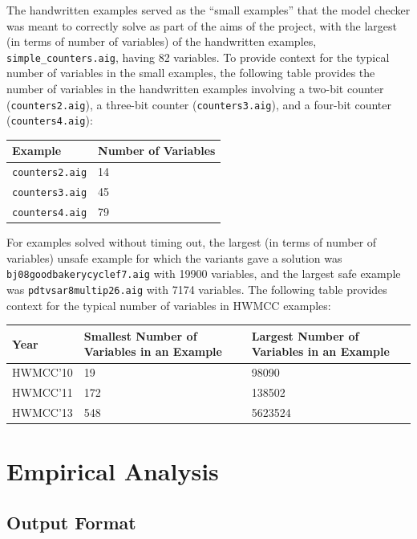 \documentclass[12pt,a4paper,twoside,openright]{report}
\begin{document}
{{The handwritten examples served as the ``small examples'' that the model checker
was meant to correctly solve as part of the aims of the project, with the largest
(in terms of number of variables) of the handwritten examples,
\verb,simple_counters.aig,, having 82 variables. %
To provide context for the typical number of variables in the small examples,
the following table provides the number of variables in the handwritten examples involving
a two-bit counter (\verb,counters2.aig,), a three-bit counter (\verb,counters3.aig,),
and a four-bit counter (\verb,counters4.aig,):
\begin{center}
\begin{tabular}{|l | l|}
\hline
Example & Number of Variables \\
\hline
{\tt counters2.aig} & 14\\
{\tt counters3.aig} & 45\\
{\tt counters4.aig} & 79\\
\hline
\end{tabular}
\end{center}

For examples solved without timing out,
the largest (in terms of number of variables) unsafe example for which the variants gave a
solution was \verb,bj08goodbakerycyclef7.aig, with 19900 variables,
and the largest safe example %
was \verb,pdtvsar8multip26.aig, with 7174 variables.
The following table provides context for the typical number of variables in HWMCC
examples:
\begin{center}
\begin{tabular}{|l | p{15em} | p{15em}|}
\hline
Year & Smallest Number of Variables in an Example & Largest Number of Variables in an
Example \\
\hline
HWMCC'10 & 19 & 98090\\
HWMCC'11 & 172 & 138502\\
HWMCC'13 & 548 & 5623524\\
\hline
\end{tabular}
\end{center}

\section{Empirical Analysis}
\label{eval:analysis}

\subsection{Output Format}
\label{eval:output}

}}
\end{document}
